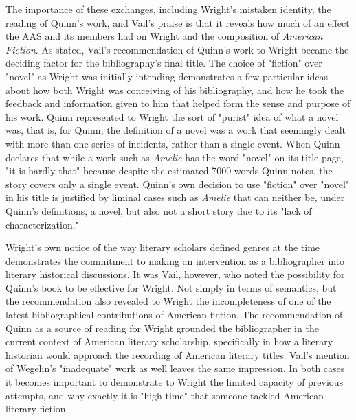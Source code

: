 The importance of these exchanges, including Wright's mistaken identity, the reading of Quinn's work, and Vail's praise is that it reveals how much of an effect the AAS and its members had on Wright and the composition of \textit{American Fiction}. As stated, Vail's recommendation of Quinn's work to Wright became the deciding factor for the bibliography's final title. The choice of "fiction" over "novel" as Wright was initially intending demonstrates a few particular ideas about how both Wright was conceiving of his bibliography, and how he  took the feedback and information given to him that helped form the sense and purpose of his work. Quinn represented to Wright the sort of "purist" idea of what a novel was, that is, for Quinn, the definition of a novel was a work that seemingly dealt with more than one series of incidents, rather than a single event. When Quinn declares that while a work such as \textit{Amelie} has the word "novel" on its title page, "it is hardly that" because despite the estimated 7000 words Quinn notes, the story covers only a single event. Quinn's own decision to use "fiction" over "novel" in his title is justified by liminal cases such as \textit{Amelie} that can neither be, under Quinn's definitions, a novel, but also not a short story due to its "lack of characterization."\autocite[5-6]{quinn_american_1936}
 
Wright's own notice of the way literary scholars defined genres at the time demonstrates the commitment to making an intervention as a bibliographer into literary historical discussions. It was Vail, however, who noted the possibility for Quinn's book to be effective for Wright. Not simply in terms of semantics, but the recommendation also revealed to Wright the incompleteness of one of the latest bibliographical contributions of American fiction. The recommendation of Quinn as a source of reading for Wright grounded the bibliographer in the current context of American literary scholarship, specifically in how a literary historian would approach the recording of American literary titles. Vail's mention of Wegelin's "inadequate" work as well leaves the same impression. In both cases it becomes important to demonstrate to Wright the limited capacity of previous attempts, and why exactly it is "high time" that someone tackled American literary fiction. 

